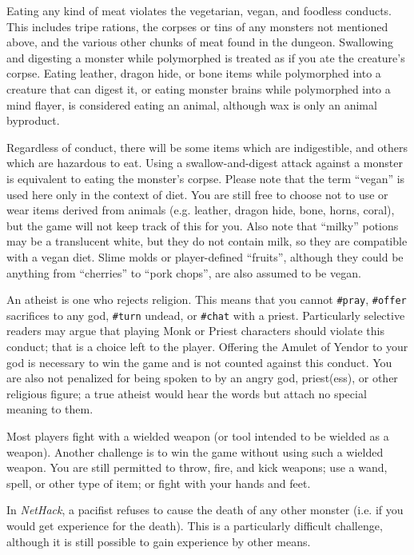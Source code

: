 Eating any kind of meat violates the vegetarian, vegan, and foodless
conducts.  This includes tripe rations, the corpses or tins of any
monsters not mentioned above, and the various other chunks of meat
found in the dungeon.  Swallowing and digesting a monster while polymorphed
is treated as if you ate the creature's corpse.
Eating leather, dragon hide, or bone items while
polymorphed into a creature that can digest it, or eating monster brains
while polymorphed into a mind flayer, is considered eating
an animal, although wax is only an animal byproduct.

Regardless of conduct, there will be some items which are indigestible,
and others which are hazardous to eat.  Using a swallow-and-digest
attack against a monster is equivalent to eating the monster's corpse.
Please note that the term ``vegan'' is used here only in the context of
diet.  You are still free to choose not to use or wear items derived
from animals (e.g. leather, dragon hide, bone, horns, coral), but the
game will not keep track of this for you.  Also note that ``milky''
potions may be a translucent white, but they do not contain milk,
so they are compatible with a vegan diet.  Slime molds or
player-defined ``fruits'', although they could be anything
from ``cherries'' to ``pork chops'', are also assumed to be vegan.

An atheist is one who rejects religion.  This means that you cannot
{\tt \#pray}, {\tt \#offer} sacrifices to any god,
{\tt \#turn} undead, or {\tt \#chat} with a priest.
Particularly selective readers may argue that playing Monk or Priest
characters should violate this conduct; that is a choice left to the
player.  Offering the Amulet of Yendor to your god is necessary to
win the game and is not counted against this conduct.  You are also
not penalized for being spoken to by an angry god, priest(ess), or
other religious figure; a true atheist would hear the words but
attach no special meaning to them.

Most players fight with a wielded weapon (or tool intended to be
wielded as a weapon).  Another challenge is to win the game without
using such a wielded weapon.  You are still permitted to throw,
fire, and kick weapons; use a wand, spell, or other type of item;
or fight with your hands and feet.

In {\it NetHack\/}, a pacifist refuses to cause the death of any other monster
(i.e. if you would get experience for the death).  This is a particularly
difficult challenge, although it is still possible to gain experience
by other means.

